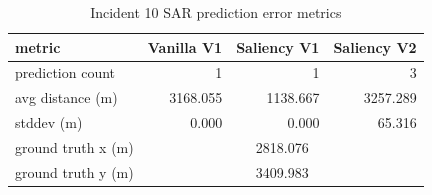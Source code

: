 \begin{table}[ht]
\centering
\caption{Incident 10 SAR prediction error metrics}
\label{tab:sar-incident-10}
\begin{tabular}{lrrr}
\hline
metric & Vanilla V1 & Saliency V1 & Saliency V2 \\
\hline
prediction count & 1 & 1 & 3 \\
avg distance (m) & 3168.055 & 1138.667 & 3257.289 \\
stddev (m) & 0.000 & 0.000 & 65.316 \\
ground truth x (m) & \multicolumn{3}{c}{2818.076} \\
ground truth y (m) & \multicolumn{3}{c}{3409.983} \\
\hline
\end{tabular}
\end{table}
